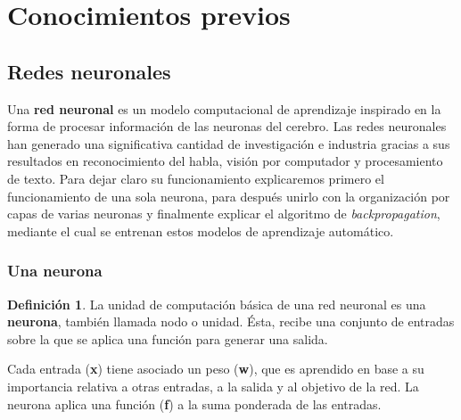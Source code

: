 \documentclass[12,twoside]{TFG-GM}
\theoremstyle{definition}
\newtheorem{definition}[theorem]{Definición}
\theoremstyle{remark}
\begin{document}
\section{Conocimientos previos}
\label{sec:conocimientosprevios}
%
%


\subsection{Redes neuronales}
Una \textbf{red neuronal} es un modelo computacional de aprendizaje inspirado en la forma de procesar información de las neuronas del cerebro. Las redes neuronales han generado una significativa cantidad de investigación e industria gracias a sus resultados en reconocimiento del habla, visión por computador y procesamiento de texto. Para dejar claro su funcionamiento explicaremos primero el funcionamiento de una sola neurona, para después unirlo con la organización por capas de varias neuronas y finalmente explicar el algoritmo de \textit{backpropagation}, mediante el cual se entrenan estos modelos de aprendizaje automático. 

\subsubsection{Una neurona}

\begin{definition} 
La unidad de computación básica de una red neuronal es una \textbf{neurona}, también llamada nodo o unidad. Ésta, recibe una conjunto de entradas sobre la que se aplica una función para generar una salida.
\end{definition}
Cada entrada (\textbf{x}) tiene asociado un peso (\textbf{w}), que es aprendido en base a su importancia relativa a otras entradas, a la salida y al objetivo de la red. La neurona  aplica una función (\textbf{f}) a la suma ponderada de las entradas. 
\end{document}
